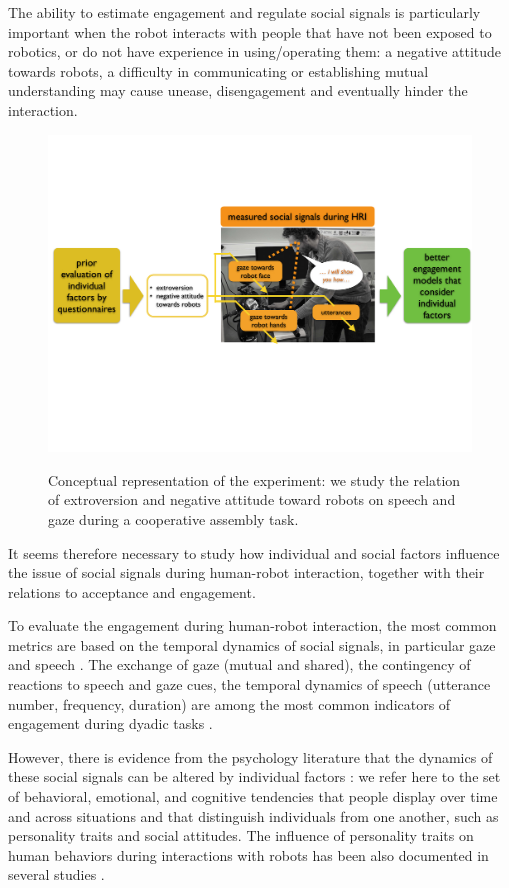 The ability to estimate engagement and regulate social signals is particularly important when the robot interacts with people that have not been exposed to robotics, or do not have experience in using/operating them: a negative attitude towards robots, a difficulty in communicating or establishing mutual understanding may cause unease, disengagement and eventually hinder the interaction.

\begin{figure}[ht!]
	\centering
	{
		\includegraphics[width=0.8\hsize]{Serena/figures/conceptual6.pdf}
	}
	\caption{Conceptual representation of the experiment: we study the relation of extroversion and negative attitude toward robots on speech and gaze during a cooperative assembly task.}
	\label{fig:concept}
\end{figure}

It seems therefore necessary to study how individual and social factors influence the issue of social signals during human-robot interaction, together with their relations to acceptance and engagement.


To evaluate the engagement during human-robot interaction, the most common metrics are based on the temporal dynamics of social signals, in particular gaze and speech \cite{Anzalone2015engagement,rich2010recognizing}.
The exchange of gaze (mutual and shared), the contingency of reactions to speech and gaze cues, the temporal dynamics of speech (utterance number, frequency, duration) are among the most common indicators of engagement during dyadic tasks \cite{ivaldi2014frontiers}.


However, there is evidence from the psychology literature that the dynamics of these social signals can be altered by individual factors \cite{LaFrance2004,Iizuka1992,Scherer1981}: we refer here to the set of behavioral, emotional, and cognitive tendencies that people display over time and across situations and that distinguish individuals from one another, such as personality traits and social attitudes.
The influence of personality traits on human behaviors during interactions with robots has been also documented in several studies \cite{Takayama2009proxemics,Dang2014personality,Aly2013personality}. 

